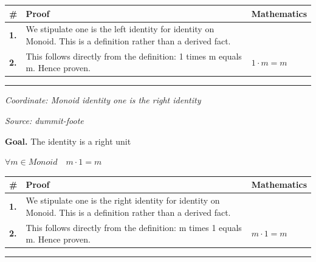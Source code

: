 \documentclass[11pt]{article}
\theoremstyle{definition}
\begin{document}
\medskip
\noindent
\begin{tabular}{@{} >{\raggedright\arraybackslash}p{} >{\raggedright\arraybackslash}p{} >{\raggedleft\arraybackslash}p{} @{}}
\textbf{\#} & \textbf{Proof} & \textbf{Mathematics} \\
\midrule
\textbf{1.} & We stipulate one is the left identity for identity on Monoid. This is a definition rather than a derived fact. & \\[0.45em]
\textbf{2.} & This follows directly from the definition: 1 times m equals m. Hence proven. & $\displaystyle 1 \cdot m = m$ \\[0.45em]
\bottomrule
\end{tabular}
\label{thm:Monoid-identity-one_is_the_left_identity}
\par\medskip\hrule
\bigskip
{}\par
\smallskip\noindent\textit{Coordinate: Monoid \cdot identity \cdot one is the right identity}\par
\smallskip\noindent\textit{Source: dummit-foote}\par
\medskip
\noindent\textbf{Goal.} The identity is a right unit\par
\noindent$\displaystyle \forall m \in Monoid\quad m \cdot 1 = m$\par
\medskip
\noindent
\begin{tabular}{@{} >{\raggedright\arraybackslash}p{} >{\raggedright\arraybackslash}p{} >{\raggedleft\arraybackslash}p{} @{}}
\textbf{\#} & \textbf{Proof} & \textbf{Mathematics} \\
\midrule
\textbf{1.} & We stipulate one is the right identity for identity on Monoid. This is a definition rather than a derived fact. & \\[0.45em]
\textbf{2.} & This follows directly from the definition: m times 1 equals m. Hence proven. & $\displaystyle m \cdot 1 = m$ \\[0.45em]
\bottomrule
\end{tabular}
\label{thm:Monoid-identity-one_is_the_right_identity}
\par\medskip\hrule
\end{document}

